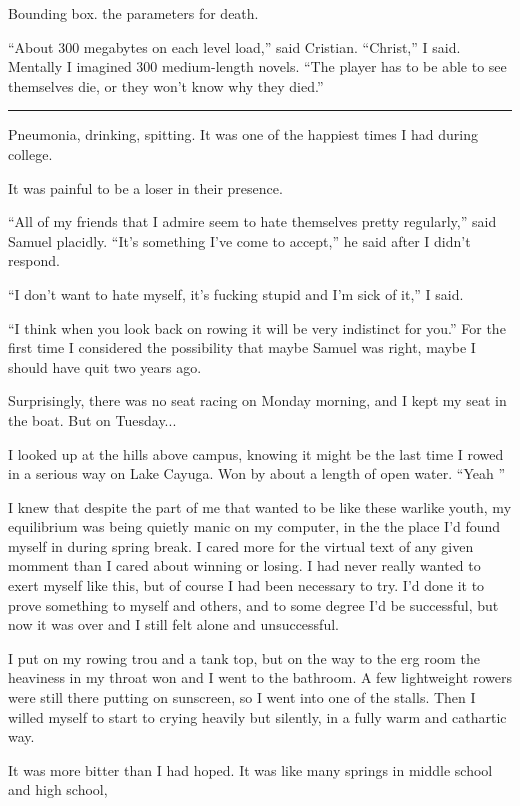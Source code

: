 Bounding box.  the parameters for death.

``About 300 megabytes on each level load,'' said Cristian.  ``Christ,'' I said.
Mentally I imagined 300 medium-length novels.  ``The player has to be able to
see themselves die, or they won't know why they died.'' 

\plainfancybreak{12pt}{2}{* * *}


Pneumonia, drinking, spitting.  It was one of the happiest times I had during college.

It was painful to be a loser in their presence.  

``All of my friends that I admire seem to hate themselves pretty regularly,''
said Samuel placidly.  ``It's something I've come to accept,'' he said after I
didn't respond.

``I don't want to hate myself, it's fucking stupid and I'm sick of it,'' I said.  

``I think when you look back on rowing it will be very indistinct for you.'' For
the first time I considered the possibility that maybe Samuel was right, maybe I
should have quit two years ago.

Surprisingly, there was no seat racing on Monday morning, and I kept my seat in
the boat.  But on Tuesday...


I looked up at the hills above campus, knowing it might be the last time I rowed
in a serious way on Lake Cayuga.  Won by about a length of open water.  ``Yeah
'' 

I knew that despite the part of me that wanted to be like these warlike youth,
my equilibrium was being quietly manic on my computer, in the the place I'd
found myself in during spring break.  I cared more for the virtual text of any
given momment than I cared about winning or losing.  I had never really wanted
to exert myself like this, but of course I had been necessary to try.  I'd done
it to prove something to myself and others, and to some degree I'd be
successful, but now it was over and I still felt alone and unsuccessful.

I put on my rowing trou and a tank top, but on the way to the erg room the
heaviness in my throat won and I went to the bathroom.  A few lightweight
rowers were still there putting on sunscreen, so I went into one of the stalls.
Then I willed myself to start to crying heavily but silently, in a fully warm
and cathartic way.  

It was more bitter than I had hoped.  It was like many springs in middle school
and high school, 

